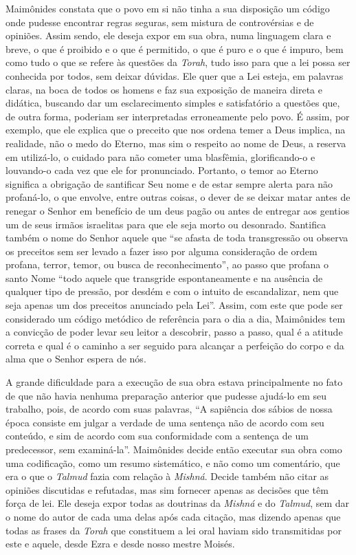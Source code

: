 Maimônides constata que o povo em si não tinha a sua disposição um
código onde pudesse encontrar regras seguras, sem mistura de
controvérsias e de opiniões. Assim sendo, ele deseja expor em sua obra,
numa linguagem clara e breve, o que é proibido e o que é permitido, o
que é puro e o que é impuro, bem como tudo o que se refere às questões
da \emph{Torah}, tudo isso para que a lei possa ser conhecida por todos,
sem deixar dúvidas. Ele quer que a Lei esteja, em palavras claras, na
boca de todos os homens e faz sua exposição de maneira direta e
didática, buscando dar um esclarecimento simples e satisfatório a
questões que, de outra forma, poderiam ser interpretadas erroneamente
pelo povo. É assim, por exemplo, que ele explica que o preceito que nos
ordena temer a Deus implica, na realidade, não o medo do Eterno, mas
sim o respeito ao nome de Deus, a reserva em utilizá-lo, o cuidado para
não cometer uma blasfêmia, glorificando-o e louvando-o cada vez que ele
for pronunciado. Portanto, o temor ao Eterno significa a obrigação de
santificar Seu nome e de estar sempre alerta para não profaná-lo, o que
envolve, entre outras coisas, o dever de se deixar matar antes de
renegar o Senhor em benefício de um deus pagão ou antes de entregar aos
gentios um de seus irmãos israelitas para que ele seja morto ou
desonrado. Santifica também o nome do Senhor aquele que ``se afasta de
toda transgressão ou observa os preceitos sem ser levado a fazer isso
por alguma consideração de ordem profana, terror, temor, ou busca de
reconhecimento'', ao passo que profana o santo Nome ``todo aquele que
transgride espontaneamente e na ausência de qualquer tipo de pressão,
por desdém e com o intuito de escandalizar, nem que seja apenas um dos
preceitos anunciado pela Lei''. Assim, com este que pode ser considerado
um código metódico de referência para o dia a dia, Maimônides tem a
convicção de poder levar seu leitor a descobrir, passo a passo, qual é a
atitude correta e qual é o caminho a ser seguido para alcançar a
perfeição do corpo e da alma que o Senhor espera de nós.


A grande dificuldade para a execução de sua obra estava principalmente
no fato de que não havia nenhuma preparação anterior que pudesse
ajudá-lo em seu trabalho, pois, de acordo com suas palavras, ``A
sapiência dos sábios de nossa época consiste em julgar a verdade de uma
sentença não de acordo com seu conteúdo, e sim de acordo com sua
conformidade com a sentença de um predecessor, sem examiná-la''.
Maimônides decide então executar sua obra como uma codificação, como um
resumo sistemático, e não como um comentário, que era o que o
\emph{Talmud} fazia com relação à \emph{Mishná}. Decide também não citar
as opiniões discutidas e refutadas, mas sim fornecer apenas as decisões
que têm força de lei. Ele deseja expor todas as doutrinas da
\emph{Mishná} e do \emph{Talmud}, sem dar o nome do autor de cada uma
delas após cada citação, mas dizendo apenas que todas as frases da
\emph{Torah} que constituem a lei oral haviam sido transmitidas por este
e aquele, desde Ezra e desde nosso mestre Moisés.

